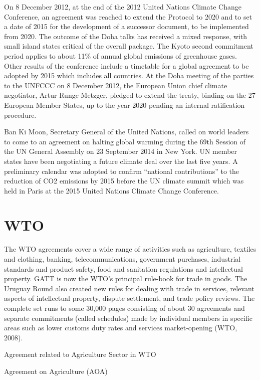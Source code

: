 \documentclass[
]{book}
\begin{document}
On 8 December 2012, at the end of the 2012 United Nations Climate Change Conference, an agreement was reached to extend the Protocol to 2020 and to set a date of 2015 for the development of a successor document, to be implemented from 2020. The outcome of the Doha talks has received a mixed response, with small island states critical of the overall package. The Kyoto second commitment period applies to about 11\% of annual global emissions of greenhouse gases. Other results of the conference include a timetable for a global agreement to be adopted by 2015 which includes all countries. At the Doha meeting of the parties to the UNFCCC on 8 December 2012, the European Union chief climate negotiator, Artur Runge-Metzger, pledged to extend the treaty, binding on the 27 European Member States, up to the year 2020 pending an internal ratification procedure.

Ban Ki Moon, Secretary General of the United Nations, called on world leaders to come to an agreement on halting global warming during the 69th Session of the UN General Assembly on 23 September 2014 in New York. UN member states have been negotiating a future climate deal over the last five years. A preliminary calendar was adopted to confirm ``national contributions'' to the reduction of CO2 emissions by 2015 before the UN climate summit which was held in Paris at the 2015 United Nations Climate Change Conference.

\hypertarget{wto}{%
\section{WTO}\label{wto}}

The WTO agreements cover a wide range of activities such as agriculture, textiles and clothing, banking, telecommunications, government purchases, industrial standards and product safety, food and sanitation regulations and intellectual property. GATT is now the WTO's principal rule-book for trade in goods. The Uruguay Round also created new rules for dealing with trade in services, relevant aspects of intellectual property, dispute settlement, and trade policy reviews. The complete set runs to some 30,000 pages consisting of about 30 agreements and separate commitments (called schedules) made by individual members in specific areas such as lower customs duty rates and services market-opening (WTO, 2008).

Agreement related to Agriculture Sector in WTO

Agreement on Agriculture (AOA)
\end{document}
